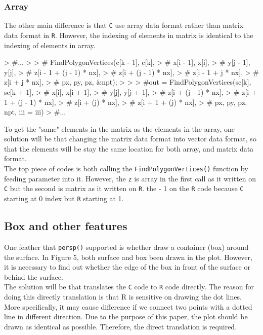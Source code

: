 \documentclass[paper=a4, fontsize=11pt]{report}
\begin{document}
\subsubsection{Array}
The other main difference is that \texttt{C} use array data format rather than matrix data format in \texttt{R}. However, the indexing of elements in matrix is identical to the indexing of elements in array. 
\begin{Schunk}
\begin{Sinput}
> #...
> 
> # FindPolygonVertices(c[k - 1], c[k],
> #         x[i - 1], x[i],
> #         y[j - 1], y[j],
> #         z[i - 1 + (j - 1) * nx],
> #         z[i + (j - 1) * nx],
> #         z[i - 1 + j * nx],
> #         z[i + j * nx],
> #         px, py, pz, &npt);
> 	    
> 
> #out = FindPolygonVertices(sc[k], sc[k + 1],
> #        x[i], x[i + 1],
> #        y[j], y[j + 1],
> #        z[i + (j - 1) * nx],
> #        z[i + 1 + (j - 1) * nx],
> #        z[i + (j) * nx],
> #        z[i + 1 + (j) * nx],
> #        px, py, pz, npt, iii = iii)
> #...
\end{Sinput}
\end{Schunk}
To get the "same" elements in the matrix as the elements in the array, one solution will be that changing the matrix data format into vector data format, so that the elements will be stay the same location for both array, and matrix data format.\\

The top piece of codes is both calling the \texttt{FindPolygonVertices()} function by feeding parameter into it. However, the \texttt{z} is array in the first call as it written on \texttt{C} but the second is matrix as it written on \texttt{R}. the - 1 on the \texttt{R} code because \texttt{C} starting at 0 index but \texttt{R} starting at 1.\\

\subsection{Box and other features}
One feather that \texttt{persp()} supported is whether draw a container (box) around the surface. In Figure 5, both surface and box been drawn in the plot. However, it is necessary to find out whether the edge of the box in front of the surface or behind the surface. \\

The solution will be that translates the \texttt{C} code to \texttt{R} code directly. The reason for doing this directly translation is that R is sensitive on drawing the dot lines. More specifically, it may cause difference if we connect two points with a dotted line in different direction. Due to the purpose of this paper, the plot should be drawn as identical as possible. Therefore, the direct translation is required.\\
\end{document}
